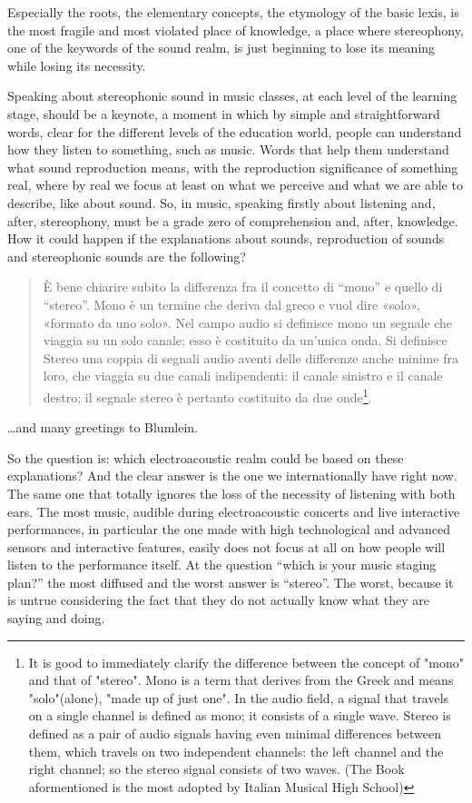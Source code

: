 \documentclass{article}
\begin{document}
Especially the roots, the elementary concepts, the etymology of the basic lexis, is the most fragile and most violated place of knowledge, a place where stereophony, one of the keywords of the sound realm, is just beginning to lose its meaning while losing its necessity.

Speaking about stereophonic sound in music classes, at each level of the learning stage, should be a keynote, a moment in which by simple and straightforward words, clear for the different levels of the education world, people can understand how they listen to something, such as music. Words that help them understand what sound reproduction means, with the reproduction significance of something real, where by real we focus at least on what we perceive and what we are able to describe, like about sound. So, in music, speaking firstly about listening and, after, stereophony, must be a grade zero of comprehension and, after, knowledge. How it could happen if the explanations about sounds, reproduction of sounds and stereophonic sounds are the following?

\begin{quotation}
È bene chiarire subito la differenza fra il concetto di “mono” e quello di “stereo”. Mono è un termine che deriva dal greco e vuol dire «solo», «formato da uno solo». Nel campo audio si definisce mono un segnale che viaggia su un solo canale; esso è costituito da un'unica onda. Si definisce Stereo una coppia di segnali audio aventi delle differenze anche minime fra loro, che viaggia su due canali indipendenti: il canale sinistro e il canale destro; il segnale stereo è pertanto costituito da due onde\footnote{It is good to immediately clarify the difference between the concept of "mono" and that of "stereo". Mono is a term that derives from the Greek and means "solo"(alone), "made up of just one". In the audio field, a signal that travels on a single channel is defined as mono; it consists of a single wave. Stereo is defined as a pair of audio signals having even minimal differences between them, which travels on two independent channels: the left channel and the right channel; so the stereo signal consists of two waves. (The Book aformentioned is the most adopted by Italian Musical High School)}. \cite{labtec01}
\end{quotation}

\ldots and many greetings to Blumlein.

So the question is: which electroacoustic realm could be based on these explanations? And the clear answer is the one we internationally have right now. The same one that totally ignores the loss of the necessity of listening with both ears. The most music, audible during electroacoustic concerts and live interactive performances, in particular the one made with high technological and advanced sensors and interactive features, easily does not focus at all on how people will listen to the performance itself. At the question “which is your music staging plan?” the most diffused  and the worst answer is “stereo”. The worst, because it is untrue considering the fact that they do not actually know what they are saying and doing.
\end{document}
